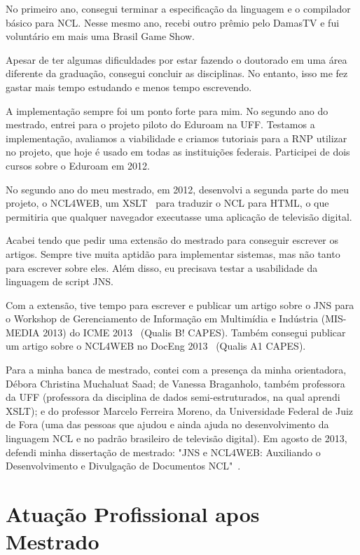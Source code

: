 \documentclass[10pt,a4paper,oneside]{book}
\begin{document}
No primeiro ano, consegui terminar a especificação da linguagem e o compilador básico para NCL. Nesse mesmo ano,
recebi outro prêmio pelo DamasTV e fui voluntário em mais uma Brasil Game Show.

Apesar de ter algumas dificuldades por estar fazendo o doutorado em uma área diferente da graduação, consegui concluir
as disciplinas. No entanto, isso me fez gastar mais tempo estudando e menos tempo escrevendo.

A implementação sempre foi um ponto forte para mim. No segundo ano do mestrado, entrei para o projeto piloto do Eduroam
na UFF. Testamos a implementação, avaliamos a viabilidade e criamos tutoriais para a RNP utilizar no projeto, que hoje
é usado em todas as instituições federais. Participei de dois cursos sobre o Eduroam em 2012.

No segundo ano do meu mestrado, em 2012, desenvolvi a segunda parte do meu projeto, o NCL4WEB, um
XSLT~\cite{clark1999xsl} para traduzir o NCL para HTML, o que permitiria que qualquer navegador executasse uma
aplicação de televisão digital.

Acabei tendo que pedir uma extensão do mestrado para conseguir escrever os artigos. Sempre tive muita aptidão para
implementar sistemas, mas não tanto para escrever sobre eles. Além disso, eu precisava testar a usabilidade da
linguagem de script JNS.

Com a extensão, tive tempo para escrever e publicar um artigo sobre o JNS para o Workshop de Gerenciamento de
Informação em Multimídia e Indústria (MIS-MEDIA 2013) do ICME 2013~\cite{silva2013jnsieee} (Qualis B! CAPES).
Também consegui publicar um artigo sobre o NCL4WEB no DocEng 2013~\cite{silva2013ncl4web} (Qualis A1 CAPES).

Para a minha banca de mestrado, contei com a presença da minha orientadora, Débora Christina Muchaluat Saad; de Vanessa
Braganholo, também professora da UFF (professora da disciplina de dados semi-estruturados, na qual aprendi XSLT);
e do professor Marcelo Ferreira Moreno, da Universidade Federal de Juiz de Fora (uma das pessoas que ajudou e ainda
ajuda no desenvolvimento da linguagem NCL e no padrão brasileiro de televisão digital). Em agosto de 2013, defendi minha
dissertação de mestrado: "JNS e NCL4WEB: Auxiliando o Desenvolvimento e Divulgação de Documentos NCL"~\cite{silva2013jns}.




\chapter{Atuação Profissional apos Mestrado}
\label{cap_atuacao}
\end{document}
